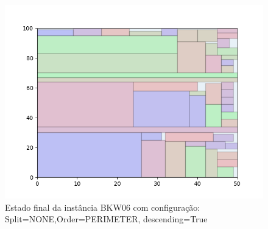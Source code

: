 \begin{figure}[H]
    \centering
    \caption[]{Estado final da instância BKW06 com configuração: Split=NONE,Order=PERIMETER, descending=True}
    \label{fig:bkw06-none-perimeter-true}
    \includegraphics[scale=0.5]{output/figures/bkw/bkw06/none/perimeter/true/00}
\end{figure}